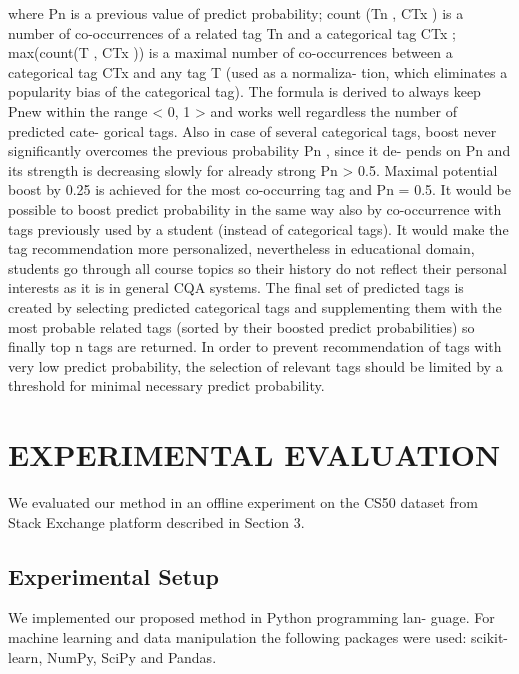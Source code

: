 \documentclass{sig-alternate}
\begin{document}
where Pn is a previous value of predict probability; count (Tn , CTx )
is a number of co-occurrences of a related tag Tn and a categorical
tag CTx ; max(count(T , CTx )) is a maximal number of co-occurrences
between a categorical tag CTx and any tag T (used as a normaliza-
tion, which eliminates a popularity bias of the categorical tag).
The formula is derived to always keep Pnew within the range
< 0, 1 > and works well regardless the number of predicted cate-
gorical tags. Also in case of several categorical tags, boost never
significantly overcomes the previous probability Pn , since it de-
pends on Pn and its strength is decreasing slowly for already strong
Pn > 0.5. Maximal potential boost by 0.25 is achieved for the most
co-occurring tag and Pn = 0.5.
It would be possible to boost predict probability in the same
way also by co-occurrence with tags previously used by a student
(instead of categorical tags). It would make the tag recommendation
more personalized, nevertheless in educational domain, students
go through all course topics so their history do not reflect their
personal interests as it is in general CQA systems.
The final set of predicted tags is created by selecting predicted
categorical tags and supplementing them with the most probable
related tags (sorted by their boosted predict probabilities) so finally
top n tags are returned. In order to prevent recommendation of
tags with very low predict probability, the selection of relevant
tags should be limited by a threshold for minimal necessary predict
probability.

\section{EXPERIMENTAL EVALUATION
}We evaluated our method in an offline experiment on the CS50
dataset from Stack Exchange platform described in Section 3.

\subsection{Experimental Setup
}We implemented our proposed method in Python programming lan-
guage. For machine learning and data manipulation the following
packages were used: scikit-learn, NumPy, SciPy and Pandas.
\end{document}
